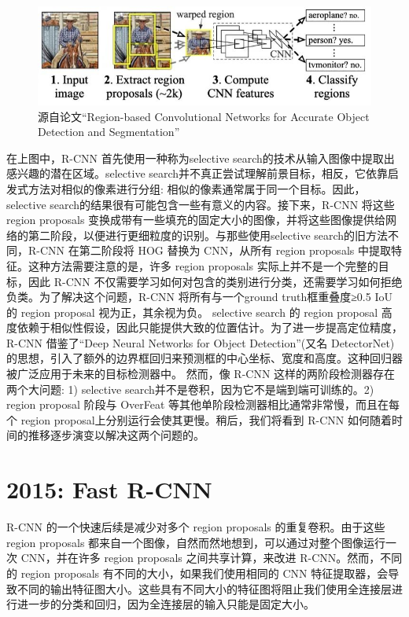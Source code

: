 \documentclass{article}
\begin{document}
	   \begin{figure}[htpb]
	   	\centering
	   	\includegraphics[width=\linewidth]{detectfig/1.jpg}
	   	\caption{源自论文“Region-based Convolutional Networks for Accurate Object Detection and Segmentation”}
	   \end{figure}
	   在上图中，R-CNN 首先使用一种称为selective search的技术从输入图像中提取出感兴趣的潜在区域。selective search并不真正尝试理解前景目标，相反，它依靠启发式方法对相似的像素进行分组: 相似的像素通常属于同一个目标。因此，selective search的结果很有可能包含一些有意义的内容。接下来，R-CNN 将这些 region proposals 变换成带有一些填充的固定大小的图像，并将这些图像提供给网络的第二阶段，以便进行更细粒度的识别。与那些使用selective search的旧方法不同，R-CNN 在第二阶段将 HOG 替换为 CNN，从所有 region proposals 中提取特征。这种方法需要注意的是，许多 region proposals 实际上并不是一个完整的目标，因此 R-CNN 不仅需要学习如何对包含的类别进行分类，还需要学习如何拒绝负类。为了解决这个问题，R-CNN 将所有与一个ground truth框重叠度≥0.5 IoU 的 region proposal 视为正，其余视为负。
	   selective search 的 region proposal 高度依赖于相似性假设，因此只能提供大致的位置估计。为了进一步提高定位精度，R-CNN 借鉴了“Deep Neural Networks for Object Detection”(又名 DetectorNet)的思想，引入了额外的边界框回归来预测框的中心坐标、宽度和高度。这种回归器被广泛应用于未来的目标检测器中。
	   然而，像 R-CNN 这样的两阶段检测器存在两个大问题: 1) selective search并不是卷积，因为它不是端到端可训练的。2) region proposal 阶段与 OverFeat 等其他单阶段检测器相比通常非常慢，而且在每个 region proposal上分别运行会使其更慢。稍后，我们将看到 R-CNN 如何随着时间的推移逐步演变以解决这两个问题的。
	   	
	   	\section{2015: Fast R-CNN}
	   	R-CNN 的一个快速后续是减少对多个 region proposals 的重复卷积。由于这些 region proposals 都来自一个图像，自然而然地想到，可以通过对整个图像运行一次 CNN，并在许多 region proposals 之间共享计算，来改进 R-CNN。然而，不同的 region proposals 有不同的大小，如果我们使用相同的 CNN 特征提取器，会导致不同的输出特征图大小。这些具有不同大小的特征图将阻止我们使用全连接层进行进一步的分类和回归，因为全连接层的输入只能是固定大小。
	   	
\end{document}

